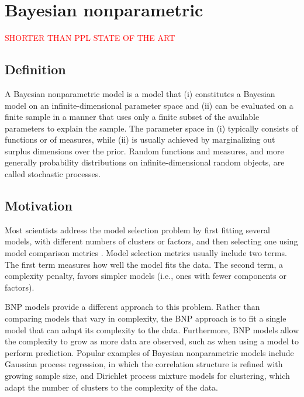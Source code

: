 \chapter{Bayesian nonparametric}
\textcolor{red}{SHORTER THAN PPL STATE OF THE ART}

\section{Definition} \label{BNP_def}
A Bayesian nonparametric model is a model that (i) constitutes a Bayesian model on an infinite-dimensional parameter space and (ii) can be evaluated on a finite sample in a manner that uses only a finite subset of the available parameters to explain the sample.
The parameter space in (i) typically consists of functions or of measures, while (ii) is usually achieved by marginalizing out surplus dimensions over the prior. Random functions and measures, and more generally probability distributions on infinite-dimensional random objects, are called stochastic processes.


\section{Motivation}
Most scientists address the model selection problem by first fitting several models, with different numbers of clusters or factors, and then selecting one using model comparison metrics \cite{Claeskens:1251912}. Model selection metrics usually include two terms. The first term measures how well the model fits the data. The second term, a complexity penalty, favors simpler models (i.e., ones with fewer components or factors).

\gls{BNP} models provide a different approach to this problem. Rather than comparing models that vary in complexity, the \gls{BNP} approach is to fit a single model that can adapt its complexity to the data. Furthermore, \gls{BNP} models allow the complexity to grow as more data are observed, such as when using a model to perform prediction.
Popular examples of Bayesian nonparametric models include Gaussian process regression, in which the correlation structure is refined with growing sample size, and Dirichlet process mixture models for clustering, which adapt the number of clusters to the complexity of the data.


